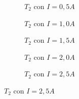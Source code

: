 \documentclass[12pt, a4paper, titlepage]{article}
\begin{document}
  \setlength{\abovecaptionskip}{-10pt}
  \begin{figure}[H]
    \centering
    \begin{minipage}[c]{0,49\textwidth}
      \begin{figure}[H]
        \hspace{-26pt}
        \resizebox{1,05\textwidth}{!}{
        }
        \caption{$T_2$ con $I = 0,5A$}
        \label{fig:i05}
      \end{figure}
    \end{minipage}
    \begin{minipage}[c]{0,49\textwidth}
      \begin{figure}[H]
        \hspace{-26pt}
        \resizebox{1,05\textwidth}{!}{
        }
        \caption{$T_2$ con $I = 1,0A$}
        \label{fig:i10}
      \end{figure}
    \end{minipage}
    \begin{minipage}[c]{0,49\textwidth}
      \begin{figure}[H]
        \hspace{-26pt}
        \resizebox{1,05\textwidth}{!}{
        }
        \caption{$T_2$ con $I = 1,5A$}
        \label{fig:i15}
      \end{figure}
    \end{minipage}
    \begin{minipage}[c]{0,49\textwidth}
      \begin{figure}[H]
        \hspace{-26pt}
        \resizebox{1,05\textwidth}{!}{
        }
        \caption{$T_2$ con $I = 2,0A$}
        \label{fig:i20}
      \end{figure}
    \end{minipage}
    \begin{minipage}[c]{0,49\textwidth}
      \begin{figure}[H]
        \hspace{-26pt}
        \resizebox{1,05\textwidth}{!}{
        }
        \caption{$T_2$ con $I = 2,5A$}
        \label{fig:i25}
      \end{figure}
    \end{minipage}
  \end{figure}
  \setlength{\abovecaptionskip}{10pt}
\end{document}
